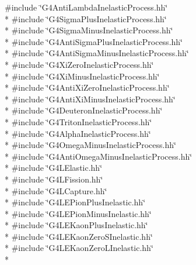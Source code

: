 {\ttfamily \#include \char`\"{}G4\+Anti\+Lambda\+Inelastic\+Process.\+hh\char`\"{}}\\*
{\ttfamily \#include \char`\"{}G4\+Sigma\+Plus\+Inelastic\+Process.\+hh\char`\"{}}\\*
{\ttfamily \#include \char`\"{}G4\+Sigma\+Minus\+Inelastic\+Process.\+hh\char`\"{}}\\*
{\ttfamily \#include \char`\"{}G4\+Anti\+Sigma\+Plus\+Inelastic\+Process.\+hh\char`\"{}}\\*
{\ttfamily \#include \char`\"{}G4\+Anti\+Sigma\+Minus\+Inelastic\+Process.\+hh\char`\"{}}\\*
{\ttfamily \#include \char`\"{}G4\+Xi\+Zero\+Inelastic\+Process.\+hh\char`\"{}}\\*
{\ttfamily \#include \char`\"{}G4\+Xi\+Minus\+Inelastic\+Process.\+hh\char`\"{}}\\*
{\ttfamily \#include \char`\"{}G4\+Anti\+Xi\+Zero\+Inelastic\+Process.\+hh\char`\"{}}\\*
{\ttfamily \#include \char`\"{}G4\+Anti\+Xi\+Minus\+Inelastic\+Process.\+hh\char`\"{}}\\*
{\ttfamily \#include \char`\"{}G4\+Deuteron\+Inelastic\+Process.\+hh\char`\"{}}\\*
{\ttfamily \#include \char`\"{}G4\+Triton\+Inelastic\+Process.\+hh\char`\"{}}\\*
{\ttfamily \#include \char`\"{}G4\+Alpha\+Inelastic\+Process.\+hh\char`\"{}}\\*
{\ttfamily \#include \char`\"{}G4\+Omega\+Minus\+Inelastic\+Process.\+hh\char`\"{}}\\*
{\ttfamily \#include \char`\"{}G4\+Anti\+Omega\+Minus\+Inelastic\+Process.\+hh\char`\"{}}\\*
{\ttfamily \#include \char`\"{}G4\+L\+Elastic.\+hh\char`\"{}}\\*
{\ttfamily \#include \char`\"{}G4\+L\+Fission.\+hh\char`\"{}}\\*
{\ttfamily \#include \char`\"{}G4\+L\+Capture.\+hh\char`\"{}}\\*
{\ttfamily \#include \char`\"{}G4\+L\+E\+Pion\+Plus\+Inelastic.\+hh\char`\"{}}\\*
{\ttfamily \#include \char`\"{}G4\+L\+E\+Pion\+Minus\+Inelastic.\+hh\char`\"{}}\\*
{\ttfamily \#include \char`\"{}G4\+L\+E\+Kaon\+Plus\+Inelastic.\+hh\char`\"{}}\\*
{\ttfamily \#include \char`\"{}G4\+L\+E\+Kaon\+Zero\+S\+Inelastic.\+hh\char`\"{}}\\*
{\ttfamily \#include \char`\"{}G4\+L\+E\+Kaon\+Zero\+L\+Inelastic.\+hh\char`\"{}}\\*
